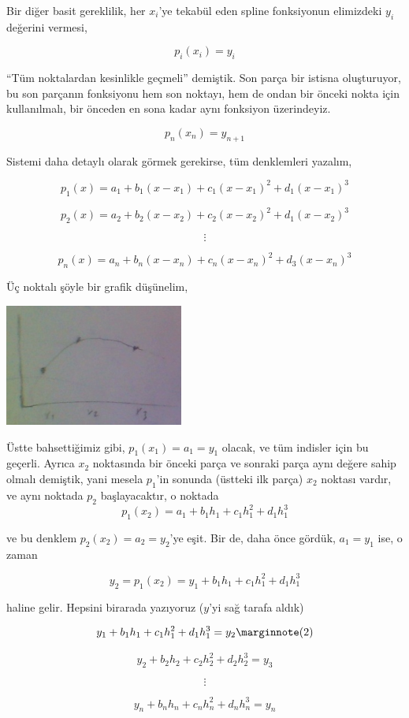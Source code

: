 \documentclass[12pt,fleqn]{article}\usepackage{../../common}
\begin{document}
Bir diğer basit gereklilik, her $x_i$'ye tekabül eden spline fonksiyonun
elimizdeki $y_i$ değerini vermesi,

$$ p_i(x_i) = y_i $$

``Tüm noktalardan kesinlikle geçmeli'' demiştik. Son parça bir istisna
oluşturuyor, bu son parçanın fonksiyonu hem son noktayı, hem de ondan bir
önceki nokta için kullanılmalı, bir önceden en sona kadar aynı fonksiyon
üzerindeyiz. 

$$ p_{n}(x_n) = y_{n+1} $$

Sistemi daha detaylı olarak görmek gerekirse, tüm denklemleri yazalım,

$$ p_1(x)  = a_1 + b_1(x-x_1) + c_1(x-x_1)^2 + d_1(x-x_1)^3$$

$$ p_2(x)  = a_2 + b_2(x-x_2) + c_2(x-x_2)^2 + d_1(x-x_2)^3$$

$$ \vdots $$

$$ p_n(x)  = a_n + b_n(x-x_n) + c_n(x-x_n)^2 + d_3(x-x_n)^3$$

Üç noktalı şöyle bir grafik düşünelim,

\includegraphics[height=4cm]{spline2.png}

Üstte bahsettiğimiz gibi, $p_1(x_1) = a_1 = y_1$ olacak, ve tüm indisler
için bu geçerli. Ayrıca $x_2$ noktasında bir önceki parça ve sonraki parça
aynı değere sahip olmalı demiştik, yani mesela $p_1$'in sonunda (üstteki
ilk parça) $x_2$ noktası vardır, ve aynı noktada $p_2$ başlayacaktır, o
noktada $$ p_1(x_2) = a_1 + b_1h_1 + c_1h_1^2 + d_1h_1^3  $$

ve bu denklem $p_2(x_2) = a_2 = y_2$'ye eşit. Bir de, daha önce gördük, $a_1 =
y_1$ ise, o zaman 

$$ y_2 = p_1(x_2) = y_1 + b_1h_1 + c_1h_1^2 + d_1h_1^3 $$

haline gelir. Hepsini birarada yazıyoruz ($y$'yi sağ tarafa aldık)

$$ y_1 + b_1h_1 + c_1h_1^2 + d_1h_1^3 = y_2 
\mlabel{2} 
$$

$$ y_2 + b_2h_2 + c_2h_2^2 + d_2h_2^3 = y_3 $$

$$ \vdots $$

$$ y_n + b_nh_n + c_nh_n^2 + d_nh_n^3 = y_n $$
\end{document}
